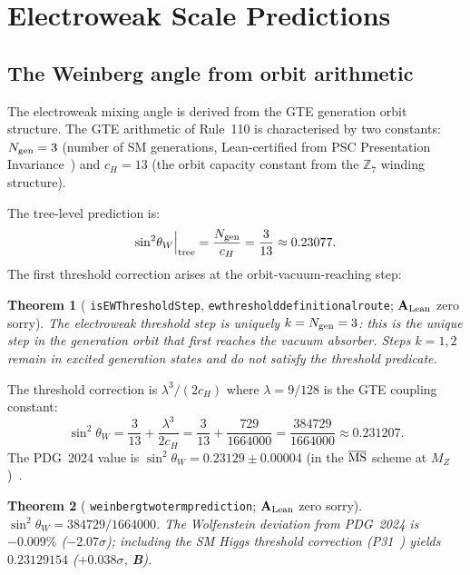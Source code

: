 \documentclass[11pt]{article}
\newtheorem{theorem}{Theorem}[section]
\theoremstyle{remark}
\newcommand{\ZS}{\mathbb{Z}_7}
\newcommand{\lean}[1]{%
  \penalty-100
  \begingroup\def\_{\textunderscore\allowbreak}\texttt{#1}\endgroup}
\newcommand{\sinwsq}{\sin^2\!\theta_W}
\newcommand{\Ngen}{N_{\rm gen}}
\newcommand{\cH}{c_H}
\newcommand{\CatAL}{\ensuremath{\textbf{A}_{\rm Lean}}}
\newcommand{\CatB}{\textbf{B}}
\begin{document}
\section{Electroweak Scale Predictions}
\label{sec:ew}

\subsection{The Weinberg angle from orbit arithmetic}
\label{ssec:weinberg}

The electroweak mixing angle is derived from the GTE generation orbit
structure.  The GTE arithmetic of Rule~110 is characterised by two constants:
$\Ngen=3$ (number of SM generations, Lean-certified from PSC Presentation
Invariance~\cite{SpivackWeinbergAngle}) and
$\cH=13$ (the orbit capacity constant from the $\ZS$ winding structure).

The tree-level prediction is:
\begin{equation}
  \label{eq:weinberg_tree}
  \sinwsq\Big|_{\rm tree} = \frac{\Ngen}{\cH} = \frac{3}{13} \approx 0.23077.
\end{equation}
The first threshold correction arises at the orbit-vacuum-reaching step:

\begin{theorem}[\lean{isEWThresholdStep}, \lean{ew\_threshold\_definitional\_route};
  \CatAL{} zero sorry]
  \label{thm:ew_threshold}
  The electroweak threshold step is uniquely $k=\Ngen=3$: this is the
  unique step in the generation orbit that first reaches the vacuum absorber.
  Steps $k=1,2$ remain in excited generation states and do not satisfy the
  threshold predicate.
\end{theorem}

The threshold correction is $\lambda^3/(2\cH)$ where $\lambda=9/128$ is
the GTE coupling constant:
\begin{equation}
  \label{eq:weinberg_twoterm}
  \sinwsq = \frac{3}{13} + \frac{\lambda^3}{2\cH}
  = \frac{3}{13} + \frac{729}{1664000}
  = \frac{384729}{1664000} \approx 0.231207.
\end{equation}
The PDG~2024 value is $\sinwsq=0.23129\pm0.00004$ (in the $\overline{\rm MS}$
scheme at $M_Z$)~\cite{ParticleDataGroup2024}.

\begin{theorem}[\lean{weinberg\_two\_term\_prediction};
  \CatAL{} zero sorry]
  \label{thm:weinberg}
  $\sinwsq = 384729/1664000$.  The Wolfenstein deviation from PDG~2024 is
  $-0.009\%$ ($-2.07\sigma$); including the SM Higgs threshold correction
  (P31~\cite{SpivackWeinbergAngle}) yields $0.23129154$ ($+0.038\sigma$, \CatB).
\end{theorem}
\end{document}
